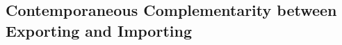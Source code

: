 \documentclass[12pt]{article}
\begin{document}

  
% 
% 

\subsection{Contemporaneous Complementarity between Exporting and Importing}\label{sec:biprobit}
\end{document}
